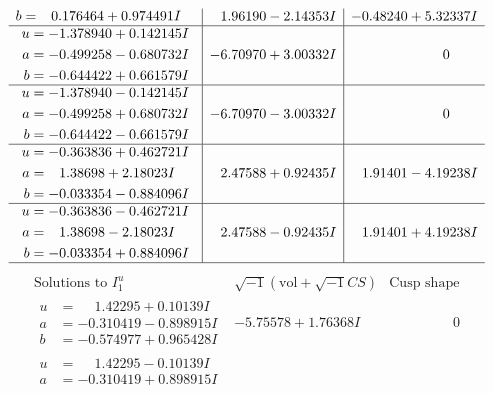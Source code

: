 \documentclass[1p]{elsarticle_modified}
\theoremstyle{definition}
\newcommand{\I}{\sqrt{-1}}
\begin{document}
$$\begin{array}{c|c|c}
\begin{aligned}
b &= \phantom{-}0.176464 + 0.974491 I\end{aligned}
 & \phantom{-}1.96190 - 2.14353 I & -0.48240 + 5.32337 I \\ \hline\begin{aligned}
u &= -1.378940 + 0.142145 I \\
a &= -0.499258 - 0.680732 I \\
b &= -0.644422 + 0.661579 I\end{aligned}
 & -6.70970 + 3.00332 I & \phantom{-0.000000 } 0 \\ \hline\begin{aligned}
u &= -1.378940 - 0.142145 I \\
a &= -0.499258 + 0.680732 I \\
b &= -0.644422 - 0.661579 I\end{aligned}
 & -6.70970 - 3.00332 I & \phantom{-0.000000 } 0 \\ \hline\begin{aligned}
u &= -0.363836 + 0.462721 I \\
a &= \phantom{-}1.38698 + 2.18023 I \\
b &= -0.033354 - 0.884096 I\end{aligned}
 & \phantom{-}2.47588 + 0.92435 I & \phantom{-}1.91401 - 4.19238 I \\ \hline\begin{aligned}
u &= -0.363836 - 0.462721 I \\
a &= \phantom{-}1.38698 - 2.18023 I \\
b &= -0.033354 + 0.884096 I\end{aligned}
 & \phantom{-}2.47588 - 0.92435 I & \phantom{-}1.91401 + 4.19238 I\\
 \hline 
 \end{array}$$\newpage$$\begin{array}{c|c|c}  
\text{Solutions to }I^u_{1}& \I (\text{vol} + \sqrt{-1}CS) & \text{Cusp shape}\\
 \hline 
\begin{aligned}
u &= \phantom{-}1.42295 + 0.10139 I \\
a &= -0.310419 - 0.898915 I \\
b &= -0.574977 + 0.965428 I\end{aligned}
 & -5.75578 + 1.76368 I & \phantom{-0.000000 } 0 \\ \hline\begin{aligned}
u &= \phantom{-}1.42295 - 0.10139 I \\
a &= -0.310419 + 0.898915 I \\

\end{aligned}
\end{array}$$
\end{document}
